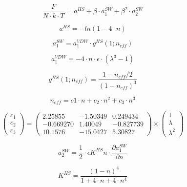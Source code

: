 \begin{multicols}{2}


\begin{equation}\label{eq:saftF18}
\frac{F}{N\cdot k\cdot T}=a^{HS}+\beta\cdot a_1^{SW}+\beta^2\cdot a_2^{SW}
\end{equation}

\begin{equation}\label{eq:saftF1}
a^{HS}=-ln(1-4\cdot n)
\end{equation}

\begin{equation}\label{eq:saftF34}
a_1^{SW}=a_1^{VDW}\cdot g^{HS}(1;n_{eff})
\end{equation}

\begin{equation}\label{eq:saftF35}
a_1^{VDW}=-4\cdot n\cdot \epsilon\cdot (\lambda^3-1)
\end{equation}

\begin{equation}\label{eq:saftF33}
g^{HS}(1;n_{eff})=\frac{1-n_{eff}/2}{(1-n_{eff})^3}
\end{equation}

\begin{equation}\label{eq:saftF36}
n_{eff}=c1\cdot n+c_2\cdot n^2+c_3\cdot n^3
\end{equation}

\begin{equation}\label{eq:saftF37}
\scriptscriptstyle
\begin{pmatrix}c_1\\c_2\\c_3\end{pmatrix}=
\begin{pmatrix}
2.25855 & -1.50349 & 0.249434 \\
-0.669270 & 1.40049 & -0.827739 \\
10.1576 & -15.0427 & 5.30827
\end{pmatrix}\times
\begin{pmatrix}
1\\ \lambda \\ \lambda^2
\end{pmatrix}
\end{equation}

\begin{equation}\label{eq:saft38}
a_2^{SW}=\frac{1}{2}\cdot \epsilon K^{HS}n\cdot \frac{\partial a_1^{SW}}{\partial n}
\end{equation}

\begin{equation}\label{eq:saft22}
K^{HS}=\frac{(1-n)^4}{1+4\cdot n+4\cdot n^4}
\end{equation}
\end{multicols}

